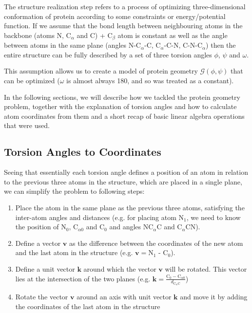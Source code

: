 The structure realization step refers to a process of optimizing three-dimensional conformation of protein according to some constraints or energy/potential function. 
If we assume that the bond length between neighbouring atoms in the backbone (atoms N, C$_\alpha$ and C) + C$_\beta$ atom is constant as well as the angle between atoms in the same plane (angles N-C$_{\alpha}$-C, C$_{\alpha}$-C-N, C-N-C$_{\alpha}$) then the entire structure can be fully described by a set of three torsion angles $\phi$, $\psi$ and $\omega$.

This assumption allows us to create a model of protein geometry $\mathcal{G}(\phi, \psi)$ that can be optimized ($\omega$ is almost always 180\degree, and so was treated as a constant). 

In the following sections, we will describe how we tackled the protein geometry problem, together with the explanation of torsion angles and how to calculate atom coordinates from them and a short recap of basic linear algebra operations that were used.

\subsection{Torsion Angles to Coordinates}

Seeing that essentially each torsion angle defines a position of an atom in relation to the previous three atoms in the structure, which are placed in a single plane, we can simplify the problem to following steps:

\begin{enumerate}
    \item Place the atom in the same plane as the previous three atoms, satisfying the inter-atom angles and distances (e.g. for placing atom N$_1$, we need to know the position of N$_0$, C$_{\alpha 0}$ and C$_0$ and angles NC$_\alpha$C and C$_\alpha$CN).
    
    \item Define a vector $\bm{v}$ as the difference between the coordinates of the new atom and the last atom in the structure (e.g. $\bm{v} = $N$_1$ - C$_0$).
    
    \item Define a unit vector $\bm{k}$ around which the vector $\bm{v}$ will be rotated. This vector lies at the intersection of the two planes (e.g. $\bm{k} = \frac{\textrm{C}_0 - \textrm{C}_{\alpha 0}}{d_{\textrm{C}_{\alpha} \textrm{C}}}$)
    
    \item Rotate the vector $\bm{v}$ around an axis with unit vector $\bm{k}$ and move it by adding the coordinates of the last atom in the structure
\end{enumerate}

